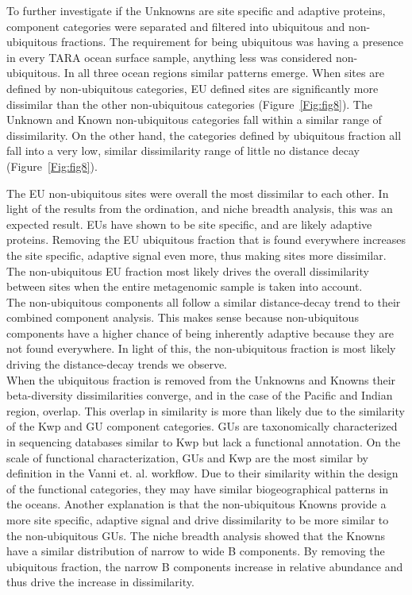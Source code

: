 To further investigate if the Unknowns are site specific and adaptive proteins, component categories were separated and filtered into ubiquitous and non-ubiquitous fractions. The requirement for being ubiquitous was having a presence in every TARA ocean surface sample, anything less was considered non-ubiquitous. In all three ocean regions similar patterns emerge. When sites are defined by non-ubiquitous categories, EU defined sites are significantly more dissimilar than the other non-ubiquitous categories (Figure~\ref{Fig:fig8}). The Unknown and Known non-ubiquitous categories fall within a similar range of dissimilarity. On the other hand, the categories defined by ubiquitous fraction all fall into a very low, similar dissimilarity range of little no distance decay (Figure~\ref{Fig:fig8}).

The EU non-ubiquitous sites were overall the most dissimilar to each other. In light of the results from the ordination, and niche breadth analysis, this was an expected result. EUs have shown to be site specific, and are likely adaptive proteins. Removing the EU ubiquitous fraction that is found everywhere increases the site specific, adaptive signal even more, thus making sites more dissimilar. The non-ubiquitous EU fraction most likely drives the overall dissimilarity between sites when the entire metagenomic sample is taken into account.\\

The non-ubiquitous components all follow a similar distance-decay trend to their combined component analysis. This makes sense because non-ubiquitous components have a higher chance of being inherently adaptive because they are not found everywhere. In light of this, the non-ubiquitous fraction is most likely driving the distance-decay trends we observe.\\

When the ubiquitous fraction is removed from the Unknowns and Knowns their beta-diversity dissimilarities converge, and in the case of the Pacific and Indian region, overlap. This overlap in similarity is more than likely due to the similarity of the Kwp and GU component categories. GUs are taxonomically characterized in sequencing databases similar to Kwp but lack a functional annotation. On the scale of functional characterization, GUs and Kwp are the most similar by definition in the Vanni et. al. workflow. Due to their similarity within the design of the functional categories, they may have similar biogeographical patterns in the oceans. Another explanation is that the non-ubiquitous Knowns provide a more site specific, adaptive signal and drive dissimilarity to be more similar to the non-ubiquitous GUs. The niche breadth analysis showed that the Knowns have a similar distribution of narrow to wide B components. By removing the ubiquitous fraction, the narrow B components increase in relative abundance and thus drive the increase in dissimilarity.\\

